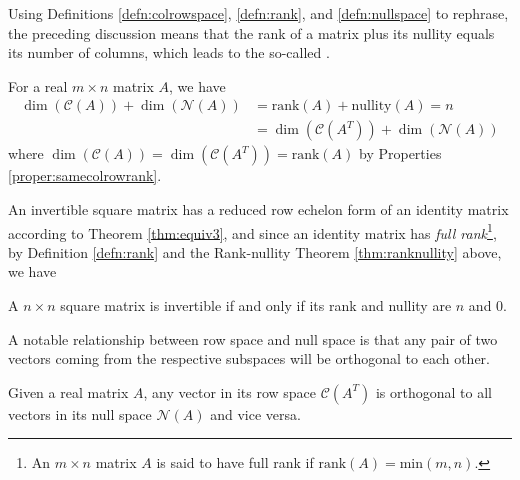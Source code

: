 Using Definitions \ref{defn:colrowspace}, \ref{defn:rank}, and \ref{defn:nullspace} to rephrase, the preceding discussion means that the rank of a matrix plus its nullity equals its number of columns, which leads to the so-called .
\begin{thm}
\label{thm:ranknullity}
For a real $m \times n$ matrix $A$, we have
\begin{subequations}
\begin{align}
\dim(\mathcal{C}(A)) + \dim(\mathcal{N}(A)) &= \text{rank}(A) + \text{nullity}(A) = n \\
&= \dim(\mathcal{C}(A^T)) + \dim(\mathcal{N}(A))
\end{align}
\end{subequations}
where $\dim(\mathcal{C}(A)) = \dim(\mathcal{C}(A^T)) = \text{rank}(A)$ by Properties \ref{proper:samecolrowrank}.
\end{thm}
An invertible square matrix has a reduced row echelon form of an identity matrix according to Theorem \ref{thm:equiv3}, and since an identity matrix has \textit{full rank}\footnote{An $m \times n$ matrix $A$ is said to have full rank if $\text{rank}(A) = \text{min}(m,n)$.}, by Definition \ref{defn:rank} and the Rank-nullity Theorem \ref{thm:ranknullity} above, we have
\begin{proper}
\label{proper:invertrank}
A $n \times n$ square matrix is invertible if and only if its rank and nullity are $n$ and $0$. 
\end{proper}
A notable relationship between row space and null space is that any pair of two vectors coming from the respective subspaces will be orthogonal to each other. 
\begin{proper}
\label{proper:rownullortho}
Given a real matrix $A$, any vector in its row space $\mathcal{C}(A^T)$ is orthogonal to all vectors in its null space $\mathcal{N}(A)$ and vice versa.
\end{proper}
